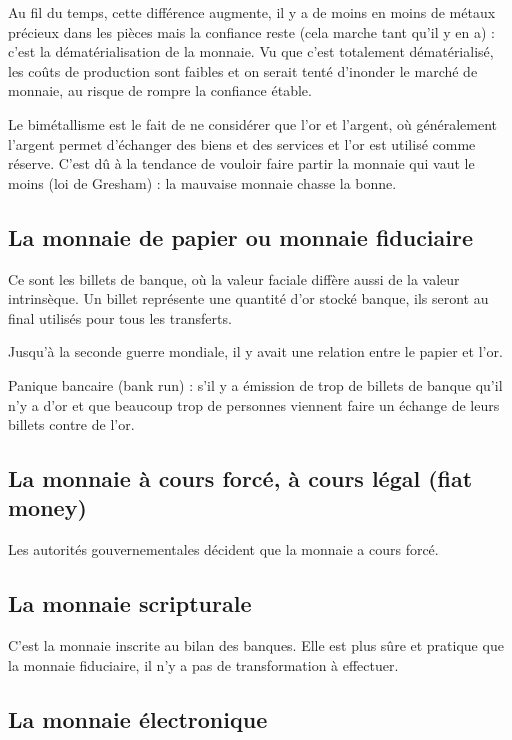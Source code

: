		Au fil du temps, cette différence augmente, il y a de moins en moins de métaux précieux dans les pièces mais la confiance reste (cela marche tant qu'il y en a) : c'est la dématérialisation de la monnaie. Vu que c'est totalement dématérialisé, les coûts de production sont faibles et on serait tenté d'inonder le marché de monnaie, au risque de rompre la confiance étable.
		
		Le bimétallisme est le fait de ne considérer que l'or et l'argent, où généralement l'argent permet d'échanger des biens et des services et l'or est utilisé comme réserve. C'est dû à la tendance de vouloir faire partir la monnaie qui vaut le moins (loi de Gresham) : la mauvaise monnaie chasse la bonne.
		
	\subsection{La monnaie de papier ou monnaie fiduciaire}
		
		Ce sont les billets de banque, où la valeur faciale diffère aussi de la valeur intrinsèque. Un billet représente une quantité d'or stocké banque, ils seront au final utilisés pour tous les transferts.
		
		Jusqu'à la seconde guerre mondiale, il y avait une relation entre le papier et l'or.
		
		Panique bancaire (bank run) : s'il y a émission de trop de billets de banque qu'il n'y a d'or et que beaucoup trop de personnes viennent faire un échange de leurs billets contre de l'or.
		
	\subsection{La monnaie à cours forcé, à cours légal (fiat money)}
		
		Les autorités gouvernementales décident que la monnaie a cours forcé.
		
	\subsection{La monnaie scripturale}
		
		C'est la monnaie inscrite au bilan des banques. Elle est plus sûre et pratique que la monnaie fiduciaire, il n'y a pas de transformation à effectuer.
		
	\subsection{La monnaie électronique}
		
